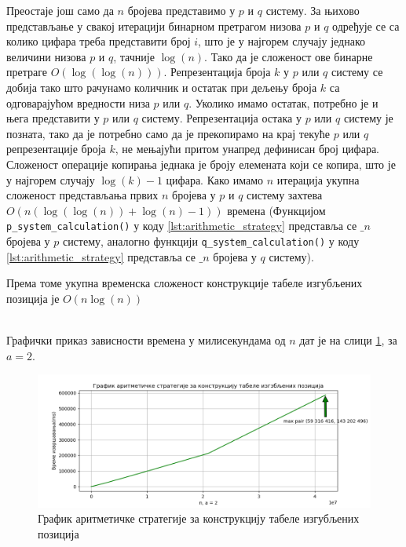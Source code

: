 \documentclass[a4paper]{article}
\begin{document}
Преостаје још само да $ n $ бројева представимо у $ p $ и $ q $ систему. За њихово представљање у свакој итерацији бинарном претрагом низова $ p $ и $ q $ одређује се са колико цифара треба представити број $ i $, што је у најгорем случају једнако величини низова $ p $ и $ q $, тачније $ \log(n) $. Тако да је сложеност ове бинарне претраге $ O(\log(\log(n))) $. Репрезентација броја $ k $ у $ p $ или $ q $ систему се добија тако што рачунамо количник и остатак при дељењу броја $ k $ са одговарајућом вредности низа $ p $ или $ q $. Уколико имамо остатак, потребно је и њега представити у $ p $ или $ q $ систему. Репрезентација остака у $ p $ или $ q $ систему је позната, тако да је потребно само да је прекопирамо на крај текуће $ p $ или $ q $ репрезентације броја $ k $, не мењајући притом унапред дефинисан број цифара. Сложеност операције копирања једнака је броју елемената који се копира, што је у најгорем случају $ \log(k) - 1 $ цифара. Како имамо $ n $ итерација укупна сложеност представљања првих $ n $ бројева у $ p $ и $ q $ систему захтева $ O(n(\log(\log(n)) + \log(n) - 1)) $ времена (Функцијом \verb|p_system_calculation()| у коду \ref{lst:arithmetic_strategy} представља се $ \_n $ бројева у $ p $ систему, аналогно функцији \verb|q_system_calculation()| у коду \ref{lst:arithmetic_strategy} представља се $ \_n $ бројева у $ q $ систему).

Према томе укупна временска сложеност конструкције табеле изгубљених позиција је $ O(n\log(n)) $



\leavevmode\\
Графички приказ зависности времена у милисекундама од $ n $ дат је на слици \ref{fig:arithmetic}, за $ a = 2 $.

\begin{figure}[H]
	\begin{center}
		\includegraphics[width=\textwidth]{arithmetic.png}
	\end{center}
	\caption{График аритметичке стратегије за конструкцију табеле изгубљених позиција}
	\label{fig:arithmetic}
\end{figure}
\end{document}
